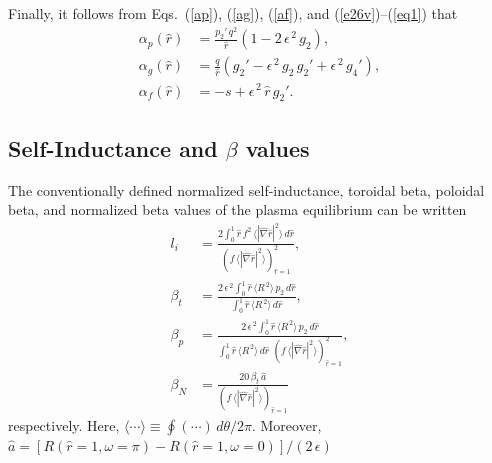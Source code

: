 \documentclass[12pt,prb,aps]{revtex4-1}
\begin{document}
Finally, it follows from Eqs.~(\ref{ap}), (\ref{ag}), (\ref{af}), and (\ref{e26v})--(\ref{eq1}) that
\begin{align}
\alpha_p(\hat{r}) &= \frac{p_2'\,q^2}{\hat{r}}\left(1-2\,\epsilon^{\,2}\,g_2\right),\\[0.5ex]
\alpha_g(\hat{r}) &= \frac{q}{\hat{r}}\left(g_2' -\epsilon^{\,2}\,g_2\,g_2'+\epsilon^{\,2}\,g_4'\right),\\[0.5ex]
\alpha_f(\hat{r}) &= -s + \epsilon^{\,2}\,\hat{r}\,g_2'.
\end{align}

\subsection{Self-Inductance and $\beta$ values}
The conventionally defined normalized self-inductance, toroidal beta, poloidal beta, and normalized beta values of the plasma equilibrium 
can be written\,\cite{gs1}
\begin{align}
l_i&= \frac{2\int_0^1 \hat{r}\,f^2\,\langle |\hat{\nabla} \hat{r}|^2\rangle\,d\hat{r}}{(f\,\langle|\hat{\nabla} \hat{r}|^2\rangle)_{\hat{r}=1}^2},\\[0.5ex]
\beta_t &=  \frac{2\,\epsilon^{\,2}\int_0^1 \hat{r}\,\langle R^{\,2}\rangle\,p_2\,d\hat{r}}{\int_0^1 \hat{r}\,\langle R^{\,2}\rangle\,d\hat{r}},\\[0.5ex]
\beta_p &=  \frac{2\,\epsilon^{\,2}\int_0^1 \hat{r}\,\langle R^{\,2}\rangle\,p_2\,d\hat{r}}
{\int_0^1\hat{r}\,\langle R^{\,2}\rangle\,d\hat{r}\,\,(f\,\langle|\hat{\nabla} \hat{r}|^2\rangle)_{\hat{r}=1}^2},\\[0.5ex]
\beta_N &=  \frac{20\,\beta_t\,\hat{a}}
{(f\,\langle|\hat{\nabla} \hat{r}|^2\rangle)_{\hat{r}=1}}
\end{align}
respectively. Here, $\langle\cdots\rangle \equiv \oint (\cdots)\,d\theta/2\pi$. Moreover, 
$\hat{a}= [R(\hat{r}=1,\omega=\pi)-R(\hat{r}=1,\omega=0)]/(2\,\epsilon)$ 
\end{document}
